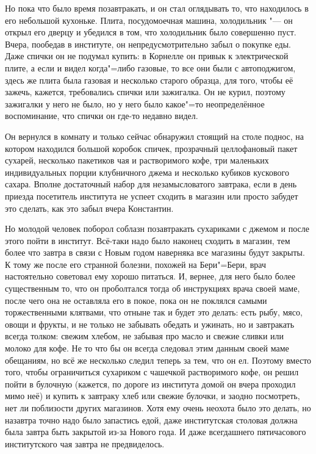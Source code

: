 Но пока что было время позавтракать, и он стал оглядывать то, что находилось в
его небольшой кухоньке.
Плита, посудомоечная машина, холодильник "--- он открыл его дверцу и убедился в
том, что холодильник было совершенно пуст.
Вчера, пообедав в институте, он непредусмотрительно забыл о покупке еды.
Даже спички он не подумал купить: в Корнелле он привык к электрической плите, а
если и видел когда"=либо газовые, то все они были с автоподжигом, здесь же плита
была газовая и несколько старого образца, для того, чтобы её зажечь, кажется,
требовались спички или зажигалка.
Он не курил, поэтому зажигалки у него не было, но у него было какое"=то
неопределённое воспоминание, что спички он где-то недавно видел.

Он вернулся в комнату и только сейчас обнаружил стоящий на столе поднос, на
котором находился большой коробок спичек, прозрачный целлофановый пакет
сухарей, несколько пакетиков чая и растворимого кофе, три маленьких
индивидуальных порции клубничного джема и несколько кубиков кускового сахара.
Вполне достаточный набор для незамысловатого завтрака, если в день приезда
посетитель института не успеет сходить в магазин или просто забудет это сделать,
как это забыл вчера Константин.

Но молодой человек поборол соблазн позавтракать сухариками с джемом и после
этого пойти в институт.
Всё-таки надо было наконец сходить в магазин, тем более что завтра в связи с
Новым годом наверняка все магазины будут закрыты.
К тому же после его странной болезни, похожей на Бери"=Бери, врач настоятельно
советовал ему хорошо питаться.
И, вернее, для него было более существенным то, что он проболтался тогда об
инструкциях врача своей маме, после чего она не оставляла его в покое, пока он
не поклялся самыми торжественными клятвами, что отныне так и будет это делать:
есть рыбу, мясо, овощи и фрукты, и не только не забывать обедать и ужинать, но и
завтракать всегда толком: свежим хлебом, не забывая про масло и свежие сливки
или молоко для кофе.
Не то что бы он всегда следовал этим данным своей маме обещаниям, но всё же
несколько следил теперь за тем, что он ел.
Поэтому вместо того, чтобы ограничиться сухариком с чашечкой растворимого кофе,
он решил пойти в булочную (кажется, по дороге из института домой он вчера
проходил мимо неё) и купить к завтраку хлеб или свежие булочки, и заодно
посмотреть, нет ли поблизости других магазинов.
Хотя ему очень неохота было это делать, но назавтра точно надо было запастись
едой, даже институтская столовая должна была завтра быть закрытой из-за Нового
года.
И даже всегдашнего пятичасового институтского чая завтра не предвиделось.

